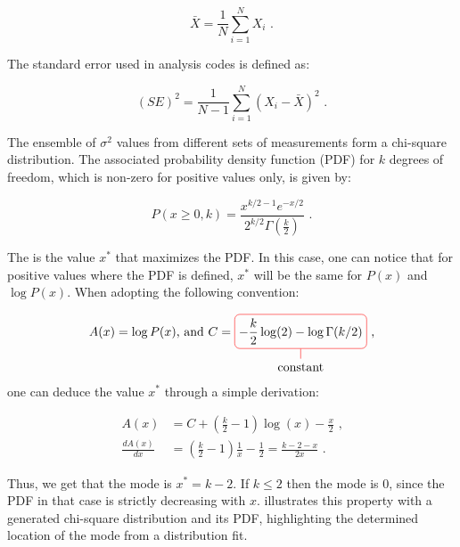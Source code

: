 \begin{equation}
    \bar{X} = \frac{1}{N} \sum_{i=1}^{N} X_{i} \text{ .}
    \label{equation:normal_mean}
\end{equation}

The standard error used in analysis codes is defined as:

\begin{equation}
    (SE)^{2} = \frac{1}{N-1} \sum_{i=1}^{N} \left( X_{i} - \bar{X} \right)^{2} \text{ .}
    \label{equation:omc3_standard_error}
\end{equation}

The ensemble of \(\sigma^{2}\) values from different sets of measurements form a chi-square distribution. 
The associated probability density function (PDF) for \(k\) degrees of freedom, which is non-zero for positive values only, is given by:

\begin{equation}
    P(x \geq 0, k) = \frac{x^{k/2-1} e^{-x/2}} {2^{k/2} \Gamma(\frac{k}{2})} \text{ .}
    \label{equation:chi2_pdf_equation}
\end{equation}

The  is the value \(x^{*}\) that maximizes the PDF.
In this case, one can notice that for positive values where the PDF is defined, \(x^{*}\) will be the same for \(P(x)\) and \(\log P(x)\).
When adopting the following convention:

\begin{equation}
    \centering
    A(x) = \log P(x) \mbox{,   and  } C =
    \tikz[baseline]{
        \node[draw=red,rounded corners,anchor=base] (m5)
        {\(\displaystyle - \frac{k}{2} \log(2) - \log \Gamma(k/2)\)};
        \node[below of=m5] (12) {constant};
        \draw[-,red] (12) -- (m5)
    } \text{ ,}
    \label{equation:chi2_pdf_derivation_convention}
\end{equation}
one can deduce the value \(x^{*}\) through a simple derivation:

\begin{equation}
	\begin{aligned}
    A(x)              &= C + \left( \frac{k}{2} - 1 \right) \log(x) - \frac{x}{2} \text{ ,} \\
    \frac{d A(x)}{dx} &= \left( \frac{k}{2} - 1 \right) \frac{1}{x} - \frac{1}{2} = \frac{k - 2 - x}{2x} \text{ .}
	\end{aligned}	
    \label{equation:chi2_pdf_mode_proof}
\end{equation}

Thus, we get that the mode is \(x^{*} = k - 2\).
If \(k \leq 2\) then the mode is 0, since the PDF in that case is strictly decreasing with \(x\).
 illustrates this property with a generated chi-square distribution and its PDF, highlighting the determined location of the mode from a distribution fit.

